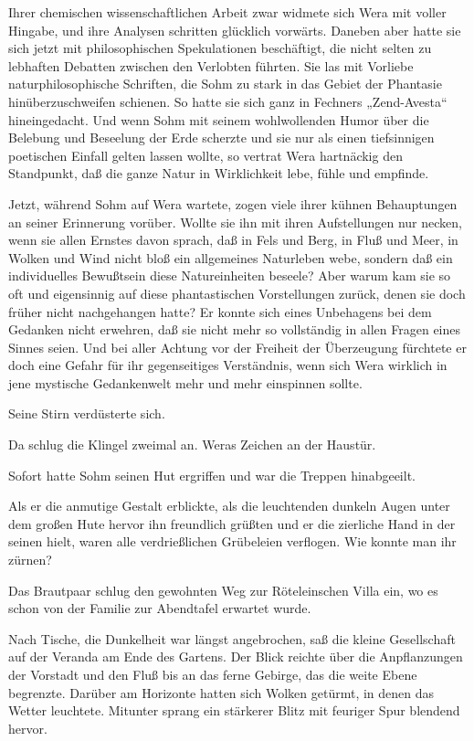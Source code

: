Ihrer chemischen wissenschaftlichen Arbeit zwar widmete sich Wera
mit voller Hingabe, und ihre Analysen schritten glücklich vorwärts.
Daneben aber hatte sie sich jetzt mit philosophischen Spekulationen
beschäftigt, die nicht selten zu lebhaften Debatten zwischen den
Verlobten führten. Sie las mit Vorliebe naturphilosophische
Schriften, die Sohm zu stark in das Gebiet der Phantasie
hinüberzuschweifen schienen. So hatte sie sich ganz in Fechners
„Zend-Avesta“ hineingedacht. Und wenn Sohm mit seinem wohlwollenden
Humor über die Belebung und Beseelung der Erde scherzte und sie nur
als einen tiefsinnigen poetischen Einfall gelten lassen wollte, so
vertrat Wera hartnäckig den Standpunkt, daß die ganze Natur in
Wirklichkeit lebe, fühle und empfinde.

Jetzt, während Sohm auf Wera wartete, zogen viele ihrer kühnen
Behauptungen an seiner Erinnerung vorüber. Wollte sie ihn mit ihren
Aufstellungen nur necken, wenn sie allen Ernstes davon sprach, daß
in Fels und Berg, in Fluß und Meer, in Wolken und Wind nicht bloß
ein allgemeines Naturleben webe, sondern daß ein individuelles
Bewußtsein diese Natureinheiten beseele? Aber warum kam sie so oft
und eigensinnig auf diese phantastischen Vorstellungen zurück,
denen sie doch früher nicht nachgehangen hatte? Er konnte sich
eines Unbehagens bei dem Gedanken nicht erwehren, daß sie nicht
mehr so vollständig in allen Fragen eines Sinnes seien. Und bei
aller Achtung vor der Freiheit der Überzeugung fürchtete er doch
eine Gefahr für ihr gegenseitiges Verständnis, wenn sich Wera
wirklich in jene mystische Gedankenwelt mehr und mehr einspinnen
sollte.

Seine Stirn verdüsterte sich.

Da schlug die Klingel zweimal an. Weras Zeichen an der Haustür.

Sofort hatte Sohm seinen Hut ergriffen und war die Treppen
hinabgeeilt.

Als er die anmutige Gestalt erblickte, als die leuchtenden dunkeln
Augen unter dem großen Hute hervor ihn freundlich grüßten und er
die zierliche Hand in der seinen hielt, waren alle verdrießlichen
Grübeleien verflogen. Wie konnte man ihr zürnen?

Das Brautpaar schlug den gewohnten Weg zur Röteleinschen Villa ein,
wo es schon von der Familie zur Abendtafel erwartet wurde.

Nach Tische, die Dunkelheit war längst angebrochen, saß die kleine
Gesellschaft auf der Veranda am Ende des Gartens. Der Blick reichte
über die Anpflanzungen der Vorstadt und den Fluß bis an das ferne
Gebirge, das die weite Ebene begrenzte. Darüber am Horizonte hatten
sich Wolken getürmt, in denen das Wetter leuchtete. Mitunter sprang
ein stärkerer Blitz mit feuriger Spur blendend hervor.

